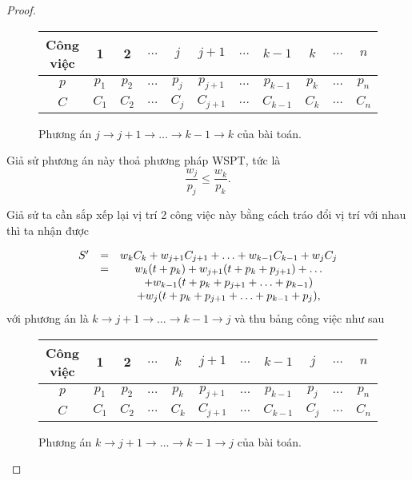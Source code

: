 \documentclass[12pt,a4paper]{report}
\begin{document}
\begin{proof}
	\begin{figure}[h!]
		\centering
		 \begin{tabular}{|c | c c c c c c c c c c |} 
		 \hline
		 Công việc & 1 & 2 & $\ldots$ & $j$ & $j+1$ & $\ldots$ & $k-1$ & $k$ & $\ldots$ & $n$ \\
		 \hline\hline
		 $p$ & $p_1$ & $p_2$ & $\ldots$ & $p_j$ & $p_{j+1}$ & $\ldots$ & $p_{k-1}$ & $p_k$ & $\ldots$ & $p_n$ \\
		 $C$ & $C_1$ & $C_2$ & $\ldots$ & $C_j$ & $C_{j+1}$ & $\ldots$ & $C_{k-1}$ & $C_k$ & $\ldots$ & $C_n$ \\
		 \hline
		 \end{tabular}
	\caption{\label{jk1}Phương án $j \rightarrow j+1 \rightarrow \ldots \rightarrow k-1 \rightarrow k$ của bài toán.}
	\end{figure}
	
	Giả sử phương án này thoả phương pháp WSPT, tức là
	\begin{equation}
	\frac{w_j}{p_j} \leq \frac{w_k}{p_k}.
	\end{equation}
	
	Giả sử ta cần sắp xếp lại vị trí 2 công việc này bằng cách tráo đổi vị trí với nhau thì ta nhận được
	
	\begin{equation} \label{kolienke2}
		\begin{array}{c c c}
		S' &=& w_k C_k + w_{j+1} C_{j+1} + \ldots + w_{k-1} C_{k-1} + w_j C_j\\

		&=& w_k(t+p_k) + w_{j+1} (t + p_k + p_{j+1}) + \ldots \\
		&& + w_{k-1}(t + p_k  + p_{j+1} + \ldots +p_{k-1}) \\
		&& + w_j(t + p_k + p_{j+1} + \ldots +p_{k-1} + p_j),
		\end{array}
	\end{equation}
	với phương án là $k \rightarrow j+1 \rightarrow \ldots \rightarrow k-1 \rightarrow j$ và thu bảng công việc như sau
	
	\begin{figure}[h!]
		\centering
		 \begin{tabular}{|c | c c c c c c c c c c |} 
		 \hline
		 Công việc & 1 & 2 & $\ldots$ & $k$ & $j+1$ & $\ldots$ & $k-1$ & $j$ & $\ldots$ & $n$ \\
		 \hline\hline
		 $p$ & $p_1$ & $p_2$ & $\ldots$ & $p_k$ & $p_{j+1}$ & $\ldots$ & $p_{k-1}$ & $p_j$ & $\ldots$ & $p_n$ \\
		 $C$ & $C_1$ & $C_2$ & $\ldots$ & $C_k$ & $C_{j+1}$ & $\ldots$ & $C_{k-1}$ & $C_j$ & $\ldots$ & $C_n$ \\
		 \hline
		 \end{tabular}
	\caption{Phương án $k \rightarrow j+1 \rightarrow \ldots \rightarrow k-1 \rightarrow j$ của bài toán.}
	\end{figure}


\end{proof}
\end{document}
